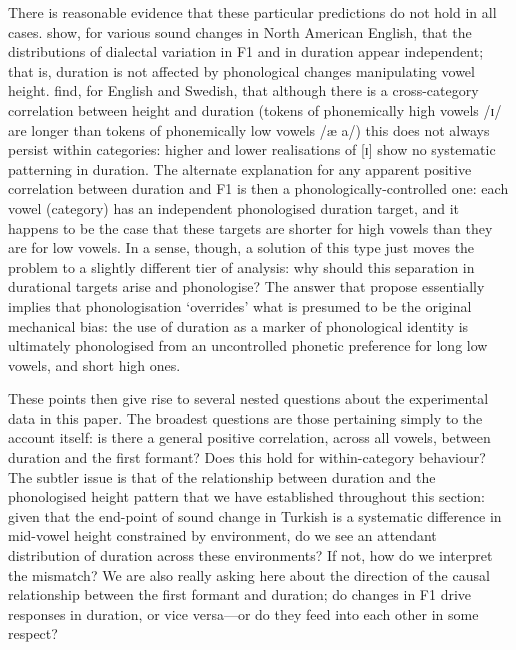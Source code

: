 There is reasonable evidence that these particular predictions do not hold in all cases. \citet{Tauberer2009} show, for various sound changes in North American English, that the distributions of dialectal variation in F1 and in duration appear independent; that is, duration is not affected by phonological changes manipulating vowel height. \cite{Toivonen2015} find, for English and Swedish, that although there is a cross-category correlation between height and duration (tokens of phonemically high vowels /ɪ/ are longer than tokens of phonemically low vowels /æ a/) this does not always persist within categories: higher and lower realisations of [ɪ] show no systematic patterning in duration. The alternate explanation for any apparent positive correlation between duration and F1 is then a phonologically-controlled one: each vowel (category) has an independent phonologised duration target, and it happens to be the case that these targets are shorter for high vowels than they are for low vowels. In a sense, though, a solution of this type just moves the problem to a slightly different tier of analysis: why should this separation in durational targets arise and phonologise? The answer that \citet{Sole2010} propose essentially implies that phonologisation `overrides' what is presumed to be the original mechanical bias: the use of duration as a marker of phonological identity is ultimately phonologised from an uncontrolled phonetic preference for long low vowels, and short high ones.

These points then give rise to several nested questions about the experimental data in this paper. The broadest questions are those pertaining simply to the account itself: is there a general positive correlation, across all vowels, between duration and the first formant? Does this hold for within-category behaviour? The subtler issue is that of the relationship between duration and the phonologised height pattern that we have established throughout this section: given that the end-point of sound change in Turkish is a systematic difference in mid-vowel height constrained by environment, do we see an attendant distribution of duration across these environments? If not, how do we interpret the mismatch? We are also really asking here about the direction of the causal relationship between the first formant and duration; do changes in F1 drive responses in duration, or vice versa---or do they feed into each other in some respect?

